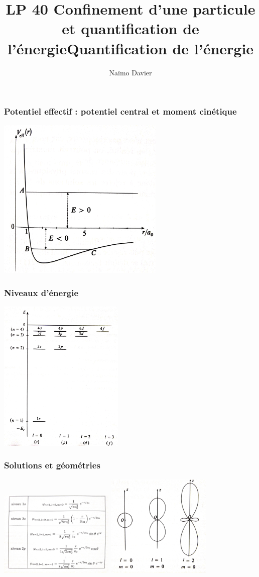 \documentclass{beamer}
\title{LP 40 Confinement d'une particule et quantification de l'énergie}
\author{Naïmo Davier}
\institute{Université Paul sabatier}
\begin{document}
	
\begin{frame}
	\titlepage
\end{frame}

\addtocounter{framenumber}{-1}
\title{Quantification de l'énergie}

\begin{frame}
\frametitle{Potentiel effectif : potentiel central et moment cinétique}
\centerline{\includegraphics[width=8cm, angle=90]{potentiel}}
\end{frame}

\begin{frame}
\frametitle{Niveaux d'énergie}
\centerline{\includegraphics[width=6cm]{niveaux_energie}}
\end{frame}

\begin{frame}
\frametitle{Solutions et géométries}
\centerline{\includegraphics[width=5.5cm, angle=90]{phi(r)}
			\includegraphics[width=5cm]{orbitales}}
\end{frame}
\end{document}
